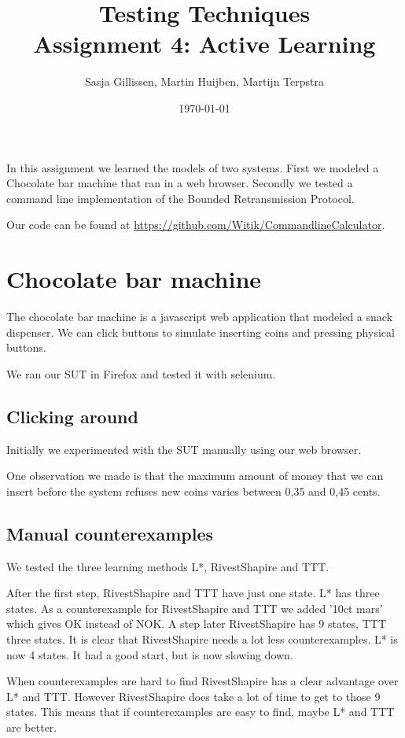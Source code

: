 \documentclass[11pt,a4paper]{article}
\author{Sasja Gillissen, Martin Huijben, Martijn Terpstra}
\date{\today}
\title{Testing Techniques\\
  \textbf{Assignment 4: Active Learning}}
\begin{document}
\maketitle

In this assignment we learned the models of two systems. First we
modeled a Chocolate bar machine that ran in a web browser. Secondly we
tested a command line implementation of the Bounded Retransmission Protocol. 

Our code can be found at \url{https://github.com/Witik/CommandlineCalculator}.

\section{Chocolate bar machine}
The chocolate bar machine is a javascript web application that modeled
a snack dispenser. We can click buttons to simulate inserting coins
and pressing physical buttons.

We ran our SUT in Firefox and tested it with selenium.

\subsection{Clicking around}
Initially we experimented with the SUT manually using our web browser.

One observation we made is that the maximum amount of money that we
can insert before the system refuses new coins varies between 0,35 and
0,45 cents.

\subsection{Manual counterexamples}
We tested the three learning methods L*, RivestShapire and TTT.

After the first step, RivestShapire and TTT have just one state. L*
has three states. As a counterexample for RivestShapire and TTT we
added '10ct mars' which gives OK instead of NOK. A step later
RivestShapire has 9 states, TTT three states. It is clear that
RivestShapire needs a lot less counterexamples. L* is now 4 states. It
had a good start, but is now slowing down.

When counterexamples are hard to find RivestShapire has a clear
advantage over L* and TTT. However RivestShapire does take a lot of
time to get to those 9 states. This means that if counterexamples are
easy to find, maybe L* and TTT are better.

\end{document}
